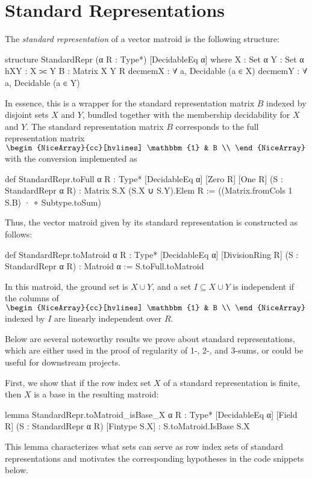 \section{Standard Representations}

The \emph{standard representation} of a vector matroid is the following structure:
\begin{leancode}
structure StandardRepr (α R : Type*)
    [DecidableEq α] where
  X : Set α
  Y : Set α
  hXY : X ⫗ Y
  B : Matrix X Y R
  decmemX : ∀ a, Decidable (a ∈ X)
  decmemY : ∀ a, Decidable (a ∈ Y)
\end{leancode}
In essence, this is a wrapper for the standard representation matrix $B$ indexed by disjoint sets $X$ and $Y$, bundled together with the membership decidability for $X$ and $Y$. The standard representation matrix $B$ corresponds to the full representation matrix $\begin{NiceArray}{cc}[hvlines] \mathbbm{1} & B \\ \end{NiceArray}$ with the conversion implemented as
\begin{leancode}
def StandardRepr.toFull {α R : Type*}
    [DecidableEq α] [Zero R] [One R]
    (S : StandardRepr α R) :
    Matrix S.X (S.X ∪ S.Y).Elem R :=
  ((Matrix.fromCols 1 S.B) · ∘ Subtype.toSum)
\end{leancode}
Thus, the vector matroid given by its standard representation is constructed as follows:
\begin{leancode}
def StandardRepr.toMatroid {α R : Type*}
    [DecidableEq α] [DivisionRing R]
    (S : StandardRepr α R) :
    Matroid α :=
  S.toFull.toMatroid
\end{leancode}
In this matroid, the ground set is $X \cup Y$, and a set $I \subseteq X \cup Y$ is independent if the columns of
$\begin{NiceArray}{cc}[hvlines] \mathbbm{1} & B \\ \end{NiceArray}$
indexed by $I$ are linearly independent over $R$.

Below are several noteworthy results we prove about standard representations, which are either used in the proof of regularity of 1-, 2-, and 3-sums, or could be useful for downstream projects.

First, we show that if the row index set $X$ of a standard representation is finite, then $X$ is a base in the resulting matroid:
\begin{leancode}
lemma StandardRepr.toMatroid_isBase_X
    {α R : Type*} [DecidableEq α] [Field R]
    (S : StandardRepr α R) [Fintype S.X] :
    S.toMatroid.IsBase S.X
\end{leancode}
This lemma characterizes what sets can serve as row index sets of standard representations and motivates the corresponding hypotheses in the code snippets below.

